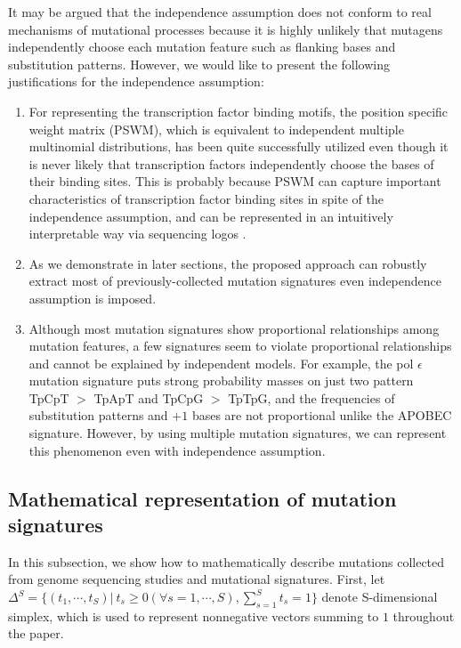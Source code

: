 It may be argued that the independence assumption does not conform to real mechanisms of mutational processes 
because it is highly unlikely that mutagens independently choose each mutation feature such as flanking bases and substitution patterns. 
However, we would like to present the following justifications for the independence assumption: 

\begin{enumerate}
\item
For representing the transcription factor binding motifs, the position specific weight matrix (PSWM), 
which is equivalent to independent multiple multinomial distributions, 
has been quite successfully utilized 
even though it is never likely that transcription factors independently choose the bases of their binding sites. 
This is probably because PSWM can capture important characteristics of transcription factor binding sites 
in spite of the independence assumption,
and can be represented in an intuitively interpretable way via sequencing logos \cite{pmid2172928}.

\item
As we demonstrate in later sections, 
the proposed approach can robustly extract most of previously-collected mutation signatures even independence assumption is imposed.

\item
Although most mutation signatures show proportional relationships among mutation features, 
a few signatures seem to violate proportional relationships and cannot be explained by independent models. 
For example, the pol $\epsilon$ mutation signature \cite{pmid23945592} puts strong probability masses 
on just two pattern TpCpT $>$ TpApT and TpCpG $>$ TpTpG, 
and the frequencies of substitution patterns and $+1$ bases are not proportional unlike the APOBEC signature.
However,  by using multiple mutation signatures, we can represent this phenomenon even with independence assumption.
\end{enumerate}






\subsection*{Mathematical representation of mutation signatures} 

In this subsection, 
we show how to mathematically describe mutations collected from genome sequencing studies and mutational signatures.
First, let $\Delta^S = \{ (t_1, \cdots, t_S) |\ t_s \geq 0 (\forall s = 1, \cdots, S), \sum_{s=1}^S t_s = 1 \}$ denote S-dimensional simplex,
which is used to represent nonnegative vectors summing to $1$ throughout the paper.


